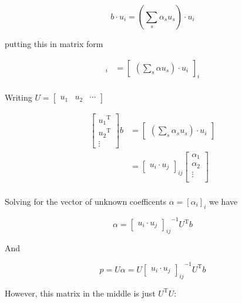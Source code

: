\documentclass{article}      %
\DeclareMathOperator{\TextTranspose}{T}
\newcommand{\transpose}[1]{{{#1}^{\TextTranspose}}}
\begin{document}
\[
b \cdot u_i = (\sum_s \alpha_s u_s) \cdot u_i
\]

putting this in matrix form

\begin{align*}
[b \cdot u_i]_i 
&= 
{
\begin{bmatrix}
(\sum_s \alpha u_s) \cdot u_i
\end{bmatrix}
}_i \\
\end{align*}

Writing $U = 
\begin{bmatrix}
u_1 & u_2 & \cdots 
\end{bmatrix}$

\begin{align*}
\begin{bmatrix}
\transpose{u_1} \\
\transpose{u_2} \\
\vdots 
\end{bmatrix}
b
&= 
\begin{bmatrix}
(\sum_s \alpha_s u_s) \cdot u_i
\end{bmatrix} \\
&= 
{
\begin{bmatrix}
u_i \cdot u_j
\end{bmatrix}
}_{ij}
\begin{bmatrix}
\alpha_1 \\
\alpha_2 \\
\vdots \\
\end{bmatrix} \\
\end{align*}

Solving for the vector of unknown coefficents $\alpha = [\alpha_i]_i$ we have

\[
\alpha
=
{{
\begin{bmatrix}
u_i \cdot u_j
\end{bmatrix}
}_{ij}}^{-1}
\transpose{U} b
\]

And 

\begin{equation}
p = U \alpha = U
{{
\begin{bmatrix}
u_i \cdot u_j
\end{bmatrix}
}_{ij}}^{-1}
\transpose{U} b
\end{equation}

However, this matrix in the middle is just $\transpose{U} U$:
\end{document}

